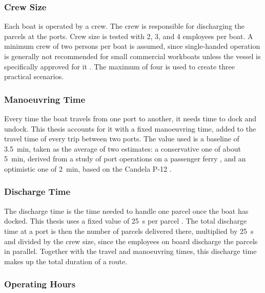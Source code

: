 \documentclass[12pt]{article}
\begin{document}
\subsubsection{Crew Size}
\label{subsubsec:crew-size}

Each boat is operated by a crew. The crew is responsible for discharging the parcels at the ports. Crew size is tested with \num{2}, \num{3}, and \num{4} employees per boat. A minimum crew of two persons per boat is assumed, since single-handed operation is generally not recommended for small commercial workboats unless the vessel is specifically approved for it \parencite{mca2023workboatcode}. The maximum of four is used to create three practical scenarios.

\subsubsection{Manoeuvring Time}
\label{subsubsec:maneuvering-time}

Every time the boat travels from one port to another, it needs time to dock and undock. This thesis accounts for it with a fixed manoeuvring time, added to the travel time of every trip between two ports. The value used is a baseline of \qty{3.5}{\minute}, taken as the average of two estimates: a conservative one of about \qty{5}{\minute}, derived from a study of port operations on a passenger ferry \parencite{klovning2024efficiency}, and an optimistic one of \qty{2}{\minute}, based on the Candela P-12 \parencite{candela2026p12}.

\subsubsection{Discharge Time}
\label{subsubsec:discharge-time}

The discharge time is the time needed to handle one parcel once the boat has docked. This thesis uses a fixed value of \qty{25}{\second} per parcel \parencite{toiparcellockers}. The total discharge time at a port is then the number of parcels delivered there, multiplied by \qty{25}{\second} and divided by the crew size, since the employees on board discharge the parcels in parallel. Together with the travel and manoeuvring times, this discharge time makes up the total duration of a route.

\subsubsection{Operating Hours}
\label{subsubsec:operating-hours}
\end{document}
